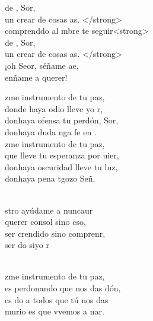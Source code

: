 \documentclass[12pt]{article}
\begin{document}
\begin{multicols*}{2}
\begin{cancion}
	 de , Sor,  \\
	un crear de cosas as. </strong>\\
	comprenddo al mbre  te seguir<strong>\\
	 de , Sor,  \\
	un crear de cosas as. </strong>\\
	¡oh Seor, séñame ae,\\
	enñame a querer! \\
\end{cancion}%

\begin{cancion}%
	zme instrumento de tu paz,\\
	donde haya odio lleve yo r,\\
	donhaya ofensa tu perdón, Sor,\\
	donhaya duda nga fe en . \\
	zme instrumento de tu paz,\\
	que lleve tu esperanza por uier,\\
	donhaya oscuridad lleve tu luz,\\
	donhaya pena tgozo Señ. \\\jump\\
	\begin{chorus}%
	stro ayúdame a nuncaur\\
	querer  consol sino cso,\\
	ser crendido sino comprenr,\\
	ser do siyo r\\
	\end{chorus}%
	\jump\\
	zme instrumento de tu paz,\\
	es perdonando que nos das dón,\\
	es do a todos que tú nos das\\
	murio es que vvemos a nar.\\
\end{cancion}%


\end{multicols*}
\end{document}
